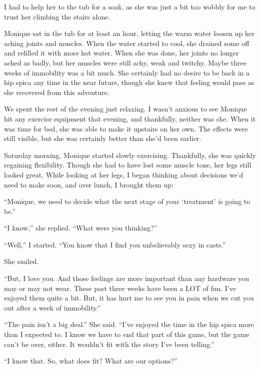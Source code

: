 I had to help her to the tub for a soak, as she was just a bit too wobbly for me to trust
her climbing the stairs alone.

\begin{thought}
Monique sat in the tub for at least an hour, letting the warm water loosen up her aching
joints and muscles. When the water started to cool, she drained some off and refilled it with
more hot water. When she was done, her joints no longer ached as badly, but her muscles were
still achy, weak and twitchy. Maybe three weeks of immobility was a bit much. She certainly had
no desire to be back in a hip spica any time in the near future, though she knew that feeling
would pass as she recovered from this adventure.
\end{thought}

We spent the rest of the evening just relaxing. I wasn't anxious to see Monique hit any
exercise equipment that evening, and thankfully, neither was she. When it was time for bed, she
was able to make it upstairs on her own. The effects were still visible, but she was certainly
better than she'd been earlier.

Saturday morning, Monique started slowly exercising. Thankfully, she was quickly regaining
flexibility. Though she had to have lost some muscle tone, her legs still looked great. While
looking at her legs, I began thinking about decisions we'd need to make soon, and over lunch, I
brought them up:

``Monique, we need to decide what the next stage of your `treatment' is going to be.''

``I know,'' she replied. ``What were you thinking?''

``Well,'' I started. ``You know that I find you unbelievably sexy in casts.''

She smiled.

``But, I love you. And those feelings are more important than any hardware you may or may
not wear. These past three weeks have been a LOT of fun. I've enjoyed them quite a bit. But, it
has hurt me to see you in pain when we cut you out after a week of immobility.''

``The pain isn't a big deal.'' She said. ``I've enjoyed the time in the hip spica more than I
expected to. I know we have to end that part of this game, but the game can't be over, either.
It wouldn't fit with the story I've been telling.''

``I know that. So, what does fit? What are our options?''

